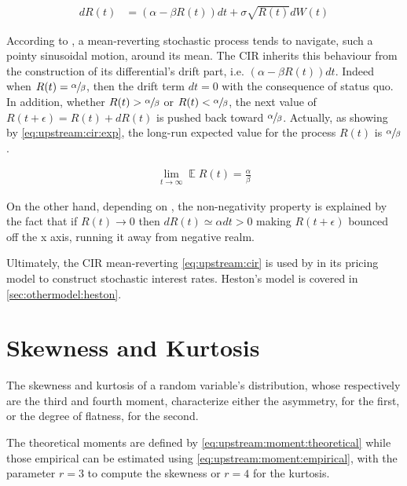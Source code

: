 \documentclass[12pt]{report}
\begin{document}
\begin{align}
dR(t) &= (\alpha - \beta R(t)) dt + \sigma \sqrt{R(t)} dW(t)
\label{eq:upstream:cir}
\end{align}

According to \citet{shreve}, a  mean-reverting stochastic process tends to navigate, such a pointy sinusoidal motion, around its mean.
The CIR inherits this behaviour from the construction of its differential's drift part, i.e. $(\alpha - \beta R(t))dt$.
Indeed when $R(t) = \sfrac{\alpha}{\beta}$, then the drift term $dt = 0$ with the consequence of status quo.
In addition, whether $R(t) > \sfrac{\alpha}{\beta}$ or $R(t) < \sfrac{\alpha}{\beta}$, the next value of $R(t + \epsilon) = R(t) + dR(t)$ is pushed back toward $\sfrac{\alpha}{\beta}$.
Actually, as showing by \cref{eq:upstream:cir:exp}, the long-run expected value for the process $R(t)$ is $\sfrac{\alpha}{\beta}$.

\begin{align}
\lim_{t \to \infty}  \mathop{\mathbb{E}} R(t) = \frac{\alpha}{\beta} \label{eq:upstream:cir:exp}
\end{align}

On the other hand, depending on \citet{shreve}, the non-negativity property is explained by the fact that if $R(t) \to 0$ then $dR(t) \simeq \alpha dt > 0$ making $R(t+\epsilon)$ bounced off the x axis, running it away from negative realm.

Ultimately, the CIR mean-reverting \cref{eq:upstream:cir} is used by \citet{heston1993} in its pricing model to construct stochastic interest rates.
Heston's model is covered in \cref{sec:othermodel:heston}.



\section{Skewness and Kurtosis}
\label{sec:Moments}



The skewness and kurtosis of a random variable's distribution, whose respectively are the third and fourth moment, characterize either the asymmetry, for the first, or the degree of flatness, for the second.

The theoretical moments are defined by \cref{eq:upstream:moment:theoretical} while those empirical can be estimated using \cref{eq:upstream:moment:empirical}, with the parameter $r = 3$ to compute the skewness or $r= 4$ for the kurtosis.
\end{document}
